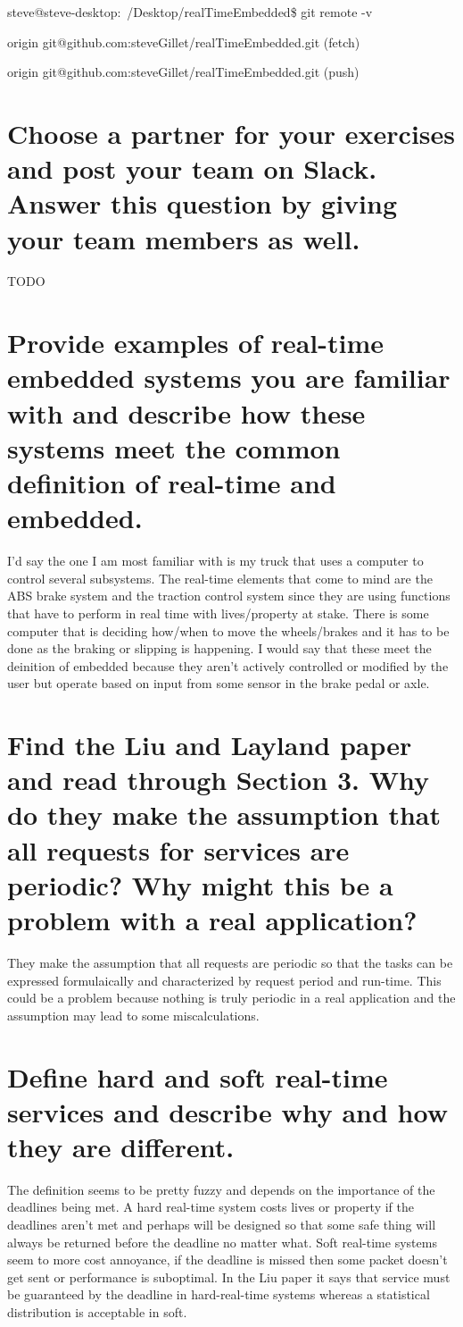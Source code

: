 \documentclass[12pt, letterpaper]{article}
\begin{document}
steve@steve-desktop:~/Desktop/realTimeEmbedded\$ git remote -v

origin  git@github.com:steveGillet/realTimeEmbedded.git (fetch)

origin  git@github.com:steveGillet/realTimeEmbedded.git (push)

\section{Choose a partner for your exercises and post your team on Slack. Answer this question by giving your
team members as well.}

TODO

\section{Provide examples of real-time embedded systems you are familiar with and describe how these
systems meet the common definition of real-time and embedded.}

I'd say the one I am most familiar with is my truck that uses a computer to control several subsystems.
The real-time elements that come to mind are the ABS brake system and the traction control system since they are using functions that have to perform in real time with lives/property at stake.
There is some computer that is deciding how/when to move the wheels/brakes and it has to be done as the braking or slipping is happening.
I would say that these meet the deinition of embedded because they aren't actively controlled or modified by the user but operate based on input from some sensor in the brake pedal or axle.

\section{Find the Liu and Layland paper and read through Section 3. Why do they make the assumption that all
requests for services are periodic? Why might this be a problem with a real application?}

They make the assumption that all requests are periodic so that the tasks can be expressed formulaically and characterized by request period and run-time.
This could be a problem because nothing is truly periodic in a real application and the assumption may lead to some miscalculations.

\section{Define hard and soft real-time services and describe why and how they are different.}

The definition seems to be pretty fuzzy and depends on the importance of the deadlines being met.
A hard real-time system costs lives or property if the deadlines aren't met and perhaps will be designed so that some safe thing will always be returned before the deadline no matter what.
Soft real-time systems seem to more cost annoyance, if the deadline is missed then some packet doesn't get sent or performance is suboptimal.
In the Liu paper it says that service must be guaranteed by the deadline in hard-real-time systems whereas a statistical distribution is acceptable in soft.
\end{document}
